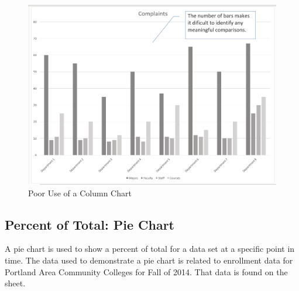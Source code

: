 \begin{figure}[H]
	\centering
	\includegraphics[width=\maxwidth{.95\linewidth}]{gfx/ch04_fig19}
	\caption{Poor Use of a Column Chart}
	\label{04:fig19}
\end{figure}

\subsection{Percent of Total: Pie Chart}

A pie chart is used to show a percent of total for a data set at a specific point in time. The data used to demonstrate a pie chart is related to enrollment data for Portland Area Community Colleges for Fall of 2014. That data is found on the  sheet.


